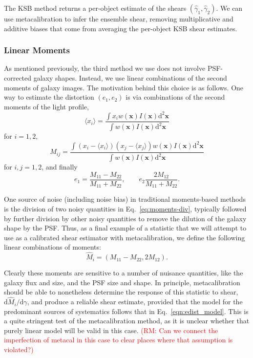 \documentclass[iop]{emulateapj}
\newcommand\rmcomment[1]{\textcolor{red}{(RM: #1)}}
\begin{document}
The KSB method returns a per-object estimate of the shears
$(\hat{\gamma}_1, \hat{\gamma}_2)$. We can use metacalibration to
infer the ensemble shear, removing multiplicative and additive biases that come from averaging the
per-object KSB shear estimates.

\subsubsection{Linear Moments}

As mentioned previously, the third method we use does not involve
PSF-corrected galaxy shapes.  Instead, we use linear combinations of
the second moments of galaxy images.  The motivation behind this
choice is as follows.  One way to estimate the distortion $(e_1,e_2)$
is via combinations of the second moments of the light profile,
\begin{equation}
\langle x_i\rangle = \frac{\int x_i w({\mathbf x}) I({\mathbf x}) \mathrm{d}^2{\mathbf x}}{\int w({\mathbf x}) I({\mathbf x}) \mathrm{d}^2{\mathbf x}}
\end{equation}
for $i=1, 2$,
\begin{equation}
M_{ij} = \frac{\int (x_i-\langle x_i\rangle)(x_j-\langle x_j\rangle) w({\mathbf x}) I({\mathbf x}) \mathrm{d}^2{\mathbf x}}{\int w({\mathbf x}) I({\mathbf x}) \mathrm{d}^2{\mathbf x}}
\end{equation}
for $i,j=1,2$, and finally 
\begin{equation}\label{eq:moments-div}
e_1 = \frac{M_{11}-M_{22}}{M_{11}+M_{22}}, \qquad e_2 \frac{2M_{12}}{M_{11}+M_{22}}.
\end{equation}

One source of noise (including noise bias) in traditional moments-based methods is the
division of two noisy quantities in Eq.~\ref{eq:moments-div},
typically followed by further division by other noisy quantities to
remove the dilution of the galaxy shape by the PSF.  Thus, as a final
example of a statistic that we will attempt to use as a calibrated
shear estimator with metacalibration, we define the following linear
combinations of moments:
\begin{equation}
\hat{M}_i = (M_{11}-M_{22}, 2M_{12}).
\end{equation}

Clearly these moments are sensitive to a number of nuisance
quantities, like the galaxy flux and size, and the PSF size and shape.  In principle,
metacalibration should 
be able to nonetheless determine the response of this statistic to
shear, $\mathrm{d}\hat{M}_i/\mathrm{d}\gamma$, and produce a reliable
shear estimate, provided that the model for the predominant sources of
systematics follows that in Eq.~\ref{eqn:edist_model}.  This is a
quite stringent test of the metacalibration method, as it is unclear whether that purely linear
model will be valid in this case.
\rmcomment{Can we connect the imperfection of metacal in this case to clear places where that
  assumption is violated?}
\end{document}
